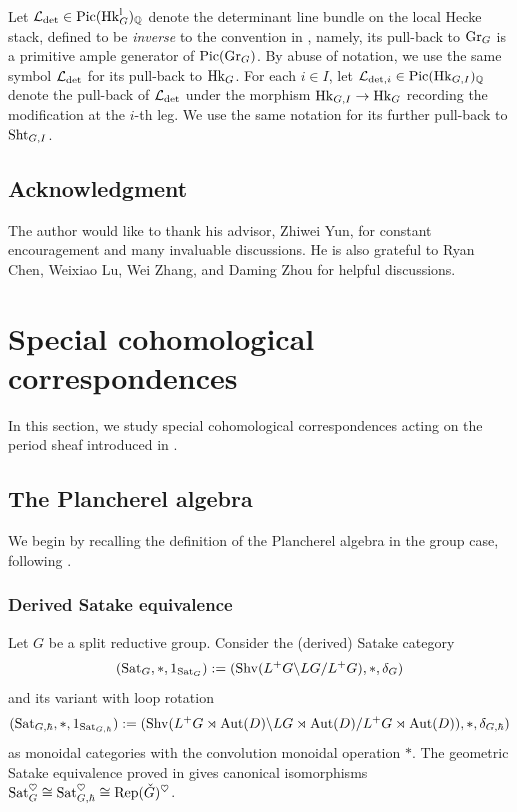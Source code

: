 \documentclass[reqno]{amsart}
\numberwithin{equation}{section}
\numberwithin{equation}{section}
\begin{document}
Let $\mathcal{L}_{\det}\in \operatorname{Pic}(\operatorname{Hk}_G^{\mathrm{l}})_{\mathbb{Q}}$ denote the determinant line bundle on the local Hecke stack, defined to be \emph{inverse} to the convention in \cite[\S4.1.1]{wang2026arithmeticvolumeshtukaslanglands}, namely, its pull-back to $\operatorname{Gr}_G$ is a primitive ample generator of $\operatorname{Pic}(\operatorname{Gr}_G)$. By abuse of notation, we use the same symbol $\mathcal{L}_{\det}$ for its pull-back to $\operatorname{Hk}_G$. For each $i\in I$, let $\mathcal{L}_{\det,i}\in \operatorname{Pic}(\operatorname{Hk}_{G,I})_{\mathbb{Q}}$ denote the pull-back of $\mathcal{L}_{\det}$ under the morphism $\operatorname{Hk}_{G,I}\to \operatorname{Hk}_G$ recording the modification at the $i$-th leg. We use the same notation for its further pull-back to $\operatorname{Sht}_{G,I}$.









\subsection*{Acknowledgment}
The author would like to thank his advisor, Zhiwei Yun, for constant encouragement and many invaluable discussions. He is also grateful to Ryan Chen, Weixiao Lu, Wei Zhang, and Daming Zhou for helpful discussions.


\section{Special cohomological correspondences}\label{sec:specialcohcor}
In this section, we study special cohomological correspondences acting on the period sheaf introduced in \cite[\S4]{liu2025higherperiodintegralsderivatives}.
\subsection{The Plancherel algebra}
We begin by recalling the definition of the Plancherel algebra in the group case, following \cite[\S8]{BZSV}.
\subsubsection{Derived Satake equivalence}
Let $G$ be a split reductive group. Consider the (derived) Satake category \[(\operatorname{Sat}_G,*, 1_{\operatorname{Sat}_G}):=(\mathrm{Shv}(L^+G\backslash LG/L^+G),*, \delta_G)\] and its variant with loop rotation \[(\operatorname{Sat}_{G,\hbar},*, 1_{\operatorname{Sat}_{G,\hbar}}):=(\mathrm{Shv}(L^+G\rtimes\operatorname{Aut}(D)\backslash LG\rtimes\operatorname{Aut}(D)/L^+G\rtimes\operatorname{Aut}(D)),*,\delta_{G,\hbar})\] as monoidal categories with the convolution monoidal operation $*$. The geometric Satake equivalence proved in \cite{MV} gives canonical isomorphisms $\operatorname{Sat}_G^{\heartsuit}\cong \operatorname{Sat}_{G,\hbar}^{\heartsuit}\cong \operatorname{Rep}(\check{G})^{\heartsuit}$.
\end{document}
